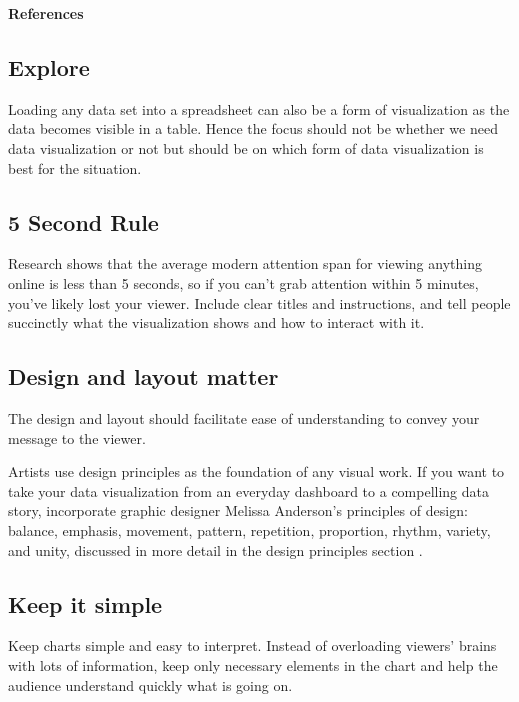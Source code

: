 \documentclass[]{book}
\theoremstyle{definition}
\theoremstyle{definition}
\theoremstyle{definition}
\theoremstyle{remark}
\begin{document}
\textbf{References}

\citep{data_journ} \citep{design_principles} \citep{DataVizTips}
\citep{practitioners_guide}

\subsection{Explore}\label{explore}

Loading any data set into a spreadsheet can also be a form of
visualization as the data becomes visible in a table. Hence the focus
should not be whether we need data visualization or not but should be on
which form of data visualization is best for the situation.

\subsection{5 Second Rule}\label{second-rule}

Research shows that the average modern attention span for viewing
anything online is less than 5 seconds, so if you can't grab attention
within 5 minutes, you've likely lost your viewer. Include clear titles
and instructions, and tell people succinctly what the visualization
shows and how to interact with it.

\subsection{Design and layout matter}\label{design-and-layout-matter}

The design and layout should facilitate ease of understanding to convey
your message to the viewer.

Artists use design principles as the foundation of any visual work. If
you want to take your data visualization from an everyday dashboard to a
compelling data story, incorporate graphic designer Melissa Anderson's
principles of design: balance, emphasis, movement, pattern, repetition,
proportion, rhythm, variety, and unity, discussed in more detail in the
design principles section \citep{design_principles}.

\subsection{Keep it simple}\label{keep-it-simple}

Keep charts simple and easy to interpret. Instead of overloading
viewers' brains with lots of information, keep only necessary elements
in the chart and help the audience understand quickly what is going on.
\end{document}
